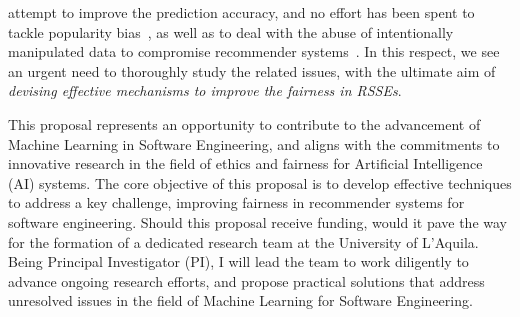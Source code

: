 attempt to improve the prediction accuracy, and no effort has been spent to tackle popularity bias~\cite{10174041}, %
as well as to deal with the abuse of intentionally manipulated data to compromise recommender systems~\cite{9678946,10.1145/3463274.3463809}. 
In this respect, we see an urgent need to thoroughly study the related issues, %
with the ultimate aim of \emph{devising effective mechanisms to improve the fairness in RSSEs}.


This proposal represents an opportunity to contribute to the advancement of Machine Learning in Software Engineering, and aligns with the commitments to innovative research in the field of ethics and fairness for Artificial Intelligence (AI) systems. The core objective of this proposal is to develop effective techniques to address a key challenge, \ie improving fairness in recommender systems for software engineering. %
Should this proposal receive funding, would it pave the way for the formation of a dedicated research team at the University of L'Aquila. Being Principal Investigator (PI), I will lead the team to work diligently to advance ongoing research efforts, and propose practical solutions that address unresolved issues in the field of Machine Learning for Software Engineering. 














